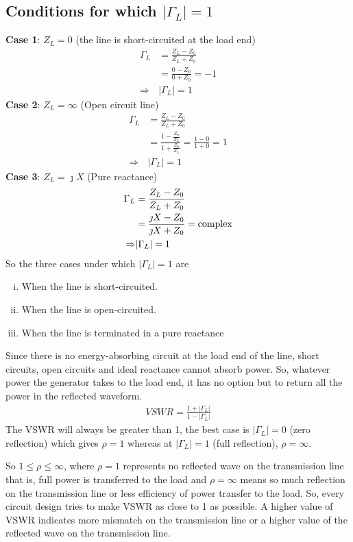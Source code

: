 \subsection{Conditions for which $|\Gamma_L|=1$}
\textbf{Case 1}: $Z_L=0$ (the line is short-circuited at the load end)
\begin{align*}	
\Gamma_L&= \frac{Z_L -Z_0}{Z_L + Z_0}\\
&= \frac{0 -Z_0}{0 + Z_0} = -1\\
\Rightarrow&|\Gamma_L|=1
\end{align*}	
\textbf{Case 2}: $Z_L=\infty$ (Open circuit line)
\begin{align*}
\Gamma_L&= \frac{Z_L -Z_0}{Z_L + Z_0}\\
&= \frac{1 -\frac{Z_0}{Z_L}}{1 + \frac{Z_0}{Z_L}} = \frac{1 - 0}{1 + 0} = 1\\
\Rightarrow&|\Gamma_L| = 1
\end{align*}
\textbf{Case 3}: $Z_L = \jmath X$ (Pure reactance)
\begin{align*}
\Gamma_L &= \frac{Z_L -Z_0}{Z_L + Z_0}\\
&= \frac{\jmath X - Z_0}{\jmath X + Z_0} = \textnormal{complex}\\
\Rightarrow&|\Gamma_L| = 1
\end{align*}
So the three cases under which $|\Gamma_L|=1$ are
\begin{enumerate}[(i)]
\item When the line is short-circuited.
\item When the line is open-circuited.
\item When the line is terminated in a pure reactance
\end{enumerate}
Since there is no energy-absorbing circuit at the load end of the line, short circuits, open circuits and ideal reactance cannot absorb power. So, whatever power the generator takes to the load end, it has no option but to return all the power in the reflected waveform.
\begin{align*}
VSWR = \frac{1+|\Gamma_L|}{1-|\Gamma_L|}
\end{align*}
The VSWR will always be greater than 1, the best case is $|\Gamma_L|=0$ (zero reflection) which gives $\rho=1$ whereas at $|\Gamma_L|=1$ (full reflection), $\rho= \infty$.

So $1\leq\rho\leq\infty$, where $\rho=1$ represents no reflected wave on the transmission line that is, full power is transferred to the load and $\rho = \infty$ means so much reflection on the transmission line or less efficiency of power transfer to the load. So, every circuit design tries to make VSWR as close to 1 as possible. A higher value of VSWR indicates more mismatch on the transmission line or a higher value of the reflected wave on the transmission line.

